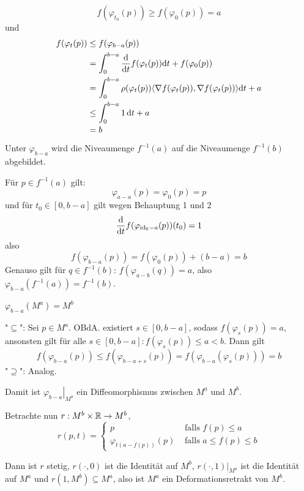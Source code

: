 \begin{bigproof}
    \begin{smallproof}
        \[ f(\varphi_{t_0}(p)) \geq f(\varphi_0(p)) = a \]
        und
        \begin{align*}
            f(\varphi_t(p)) 
            & \leq f(\varphi_{b-a}(p)) \\
            & = \int_0^{b-a}\derive{t} f(\varphi_t(p)) \opd t + f(\varphi_0(p)) \\
            & = \int_0^{b-a}\rho(\varphi_t(p)) \langle \grad f (\varphi_t(p)), \grad f (\varphi_t(p)) \rangle \opd t + a \\
            & \leq \int_0^{b-a} 1 \, \opd t + a \\
            & = b
        \end{align*}
    \end{smallproof}

    \begin{claim} 
        Unter $\varphi_{b-a}$ wird die Niveaumenge 
        $f^{-1}(a)$ auf die Niveaumenge $f^{-1}(b)$ abgebildet.
    \end{claim}
     
    \begin{smallproof}
        Für $p \in f^{-1}(a)$ gilt:
        \[ \varphi_{a-a}(p) = \varphi_0(p) = p \]
        und für $t_0 \in [0, b - a]$ gilt wegen Behauptung 1 und 2
        \[ \derive{t}f(\varphi_{\id_{\R} - a}(p)) (t_0) = 1 \]
        also
        \[ f(\varphi_{b - a}(p)) = f(\varphi_{0}(p)) + (b - a) = b \]
        Genauso gilt für $q \in f^{-1}(b)$: $f(\varphi_{a - b}(q)) = a$, also 
        $\varphi_{b - a}(f^{-1}(a)) = f^{-1}(b)$.
    \end{smallproof}

    \begin{claim}
        $\varphi_{b - a} (M^a) = M^b$
    \end{claim}

    \begin{smallproof}
        "$\subseteq$": Sei $p \in M^a$. OBdA. existiert $s \in [0, b-a]$, sodass 
        $f(\varphi_s(p)) = a$, ansonsten gilt für alle 
        $s \in [0, b-a]: f(\varphi_s(p)) \leq a < b$. Dann gilt
        \[ f(\varphi_{b-a}(p)) \leq f(\varphi_{b-a+s}(p)) = f(\varphi_{b-a}(\varphi_s(p))) = b \] 
        "$\supseteq$": Analog.
    \end{smallproof}

    Damit ist $\left. \varphi_{b-a} \right\vert_{M^a}$ ein Diffeomorphismus zwischen
    $M^a$ und $M^b$. 

    Betrachte nun $r: M^b \times { \mathbb R } \to M^b$,
    \[  
        r(p, t) = \begin{cases}
            p & \text{ falls } f(p) \leq a \\
            \varphi_{t(a - f(p))}(p) & \text{ falls } a \leq f(p) \leq b 
        \end{cases}
    \]

    Dann ist $r$ stetig, $r(\cdot, 0)$ ist die Identität auf $M^b$, 
    $r(\cdot, 1)|_{M^a}$ ist die Identität auf $M^a$ und 
    $r(1, M^b) \subseteq M^a$, also ist $M^a$ ein Deformationsretrakt von $M^b$.

\end{bigproof}

